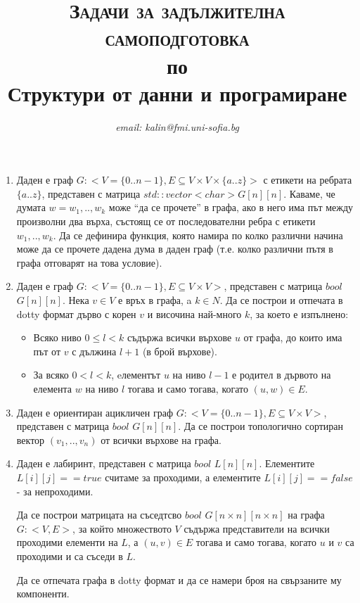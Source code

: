 \documentclass[12pt,a4paper]{article}
\author{\textit{email: kalin@fmi.uni-sofia.bg}}
\title{\textsc{Задачи за задължителна самоподготовка} \\
по \\
Структури от данни и програмиране}
\begin{document}
\maketitle



\begin{enumerate}


	\item Даден е граф $G:<V=\{0..n-1\},E\subseteq V \times V \times \{a..z\}>$ с етикети на ребрата $\{a..z\}$, представен с матрица $std::vector<char> G[n][n]$. Каваме, че думата $w=w_1,..,w_k$ може ``да се прочете'' в графа, ако в него има път между произволни два върха, състоящ се от последователни ребра с етикети $w_1,..,w_k$. Да се дефинира функция, която намира по колко различни начина може да се прочете дадена дума в даден граф (т.е. колко различни пътя в графа отговарят на това условие).

	\item  Даден е граф $G:<V=\{0..n-1\},E \subseteq V \times V >$, представен с матрица $bool$ $G[n][n]$. Нека $v \in V$ е връх в графа, a $k \in N$. Да се построи и отпечата в dotty формат дърво с корен $v$ и височина най-много $k$, за което е изпълнено:
	\begin{itemize}
		\item Всяко ниво $0 \leq l < k$ съдържа всички върхове $u$ от графа, до които има път от $v$ с дължина $l+1$ (в брой върхове).
		\item За всяко $0 < l < k$, eлементът $u$ на ниво $l-1$ е родител в дървото на елемента $w$ на ниво $l$ тогава и само тогава, когато $(u,w) \in E$.
	\end{itemize}

	\item Даден е ориентиран ацикличен граф $G:<V=\{0..n-1\},E \subseteq V \times V >$, представен с матрица $bool$ $G[n][n]$. Да се построи топологично сортиран вектор $(v_1,..,v_n)$ от всички върхове на графа.

	\item Даден е лабиринт, представен с матрица $bool$ $L[n][n]$. Елементите $L[i][j]==true$ считаме за проходими, а елементите $L[i][j]==false$ - за непроходими.

	Да се построи матрицата на съседтсво $bool$ $G[n \times n][n \times n]$ на графа $G:<V,E>$, за който множеството $V$ съдържа представители на всички проходими елементи на $L$, а $(u,v) \in E$ тогава и само тогава, когато $u$ и $v$ са проходими и са съседи в $L$.

	Да се отпечата графа в dotty формат и да се намери броя на свързаните му компоненти.



\end{enumerate}
\end{document}

